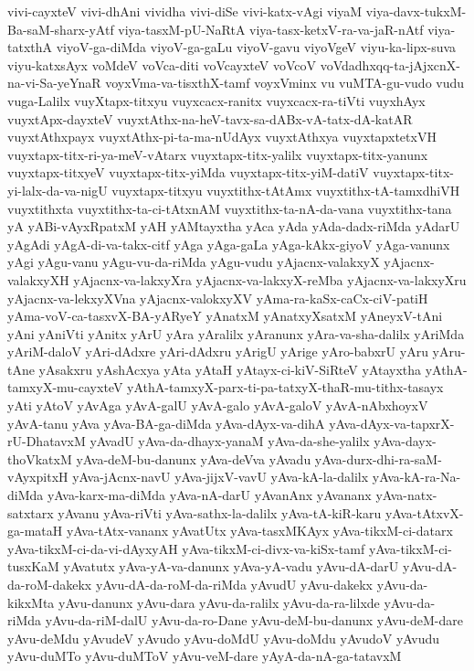 {vivi-cayxteV
vivi-dhAni
vividha
vivi-diSe
vivi-katx-vAgi
viyaM
viya-davx-tukxM-Ba-saM-sharx-yAtf
viya-tasxM-pU-NaRtA
viya-tasx-ketxV-ra-va-jaR-nAtf
viya-tatxthA
viyoV-ga-diMda
viyoV-ga-gaLu
viyoV-gavu
viyoVgeV
viyu-ka-lipx-suva
viyu-katxsAyx
voMdeV
voVca-diti
voVcayxteV
voVcoV
voVdadhxqq-ta-jAjxcnX-na-vi-Sa-yeYnaR
voyxVma-va-tisxthX-tamf
voyxVminx
vu
vuMTA-gu-vudo
vudu
vuga-Lalilx
vuyXtapx-titxyu
vuyxcacx-ranitx
vuyxcacx-ra-tiVti
vuyxhAyx
vuyxtApx-dayxteV
vuyxtAthx-na-heV-tavx-sa-dABx-vA-tatx-dA-katAR
vuyxtAthxpayx
vuyxtAthx-pi-ta-ma-nUdAyx
vuyxtAthxya
vuyxtapxtetxVH
vuyxtapx-titx-ri-ya-meV-vAtarx
vuyxtapx-titx-yalilx
vuyxtapx-titx-yanunx
vuyxtapx-titxyeV
vuyxtapx-titx-yiMda
vuyxtapx-titx-yiM-datiV
vuyxtapx-titx-yi-lalx-da-va-nigU
vuyxtapx-titxyu
vuyxtithx-tAtAmx
vuyxtithx-tA-tamxdhiVH
vuyxtithxta
vuyxtithx-ta-ci-tAtxnAM
vuyxtithx-ta-nA-da-vana
vuyxtithx-tana
yA
yABi-vAyxRpatxM
yAH
yAMtayxtha
yAca
yAda
yAda-dadx-riMda
yAdarU
yAgAdi
yAgA-di-va-takx-citf
yAga
yAga-gaLa
yAga-kAkx-giyoV
yAga-vanunx
yAgi
yAgu-vanu
yAgu-vu-da-riMda
yAgu-vudu
yAjacnx-valakxyX
yAjacnx-valakxyXH
yAjacnx-va-lakxyXra
yAjacnx-va-lakxyX-reMba
yAjacnx-va-lakxyXru
yAjacnx-va-lekxyXVna
yAjacnx-valokxyXV
yAma-ra-kaSx-caCx-ciV-patiH
yAma-voV-ca-tasxvX-BA-yARyeY
yAnatxM
yAnatxyXsatxM
yAneyxV-tAni
yAni
yAniVti
yAnitx
yArU
yAra
yAralilx
yAranunx
yAra-va-sha-dalilx
yAriMda
yAriM-daloV
yAri-dAdxre
yAri-dAdxru
yArigU
yArige
yAro-babxrU
yAru
yAru-tAne
yAsakxru
yAshAcxya
yAta
yAtaH
yAtayx-ci-kiV-SiRteV
yAtayxtha
yAthA-tamxyX-mu-cayxteV
yAthA-tamxyX-parx-ti-pa-tatxyX-thaR-mu-tithx-tasayx
yAti
yAtoV
yAvAga
yAvA-galU
yAvA-galo
yAvA-galoV
yAvA-nAbxhoyxV
yAvA-tanu
yAva
yAva-BA-ga-diMda
yAva-dAyx-va-dihA
yAva-dAyx-va-tapxrX-rU-DhatavxM
yAvadU
yAva-da-dhayx-yanaM
yAva-da-she-yalilx
yAva-dayx-thoVkatxM
yAva-deM-bu-danunx
yAva-deVva
yAvadu
yAva-durx-dhi-ra-saM-vAyxpitxH
yAva-jAcnx-navU
yAva-jijxV-vavU
yAva-kA-la-dalilx
yAva-kA-ra-Na-diMda
yAva-karx-ma-diMda
yAva-nA-darU
yAvanAnx
yAvananx
yAva-natx-satxtarx
yAvanu
yAva-riVti
yAva-sathx-la-dalilx
yAva-tA-kiR-karu
yAva-tAtxvX-ga-mataH
yAva-tAtx-vananx
yAvatUtx
yAva-tasxMKAyx
yAva-tikxM-ci-datarx
yAva-tikxM-ci-da-vi-dAyxyAH
yAva-tikxM-ci-divx-va-kiSx-tamf
yAva-tikxM-ci-tusxKaM
yAvatutx
yAva-yA-va-danunx
yAva-yA-vadu
yAvu-dA-darU
yAvu-dA-da-roM-dakekx
yAvu-dA-da-roM-da-riMda
yAvudU
yAvu-dakekx
yAvu-da-kikxMta
yAvu-danunx
yAvu-dara
yAvu-da-ralilx
yAvu-da-ra-lilxde
yAvu-da-riMda
yAvu-da-riM-dalU
yAvu-da-ro-Dane
yAvu-deM-bu-danunx
yAvu-deM-dare
yAvu-deMdu
yAvudeV
yAvudo
yAvu-doMdU
yAvu-doMdu
yAvudoV
yAvudu
yAvu-duMTo
yAvu-duMToV
yAvu-veM-dare
yAyA-da-nA-ga-tatavxM
}
